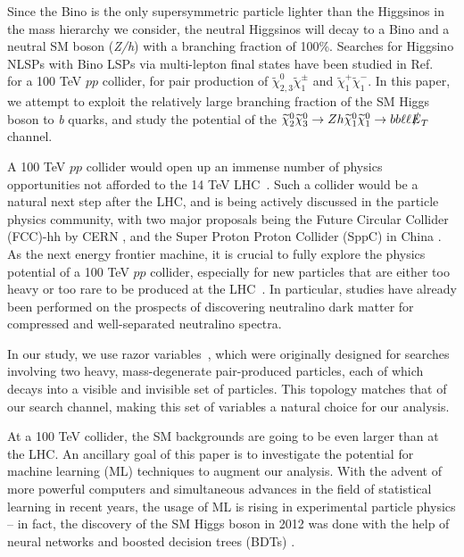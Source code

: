 \documentclass[a4paper,11pt]{article}
\newcommand{\N}{\widetilde{\chi}^0}
\newcommand{\C}{\widetilde{\chi}^\pm}
\newcommand{\met}{{\slashed{E}_T}}
\begin{document}
Since the Bino is the only supersymmetric particle lighter than the Higgsinos in
the mass hierarchy we consider, the neutral Higgsinos will decay to a Bino and a
neutral SM boson (\emph{Z/h}) with a branching fraction of 100\%.  Searches for
Higgsino NLSPs with Bino LSPs via  multi-lepton final states have been studied
in Ref.~\cite{Gori:2014oua} for a 100 TeV $pp$ collider, for pair production of
$\N_{2,3}\C_1$ and
$\widetilde\chi_{1}^+\widetilde\chi_1^-$. In this paper, we attempt to exploit
the relatively large branching fraction of the SM Higgs boson to \emph{b} quarks,
and study the potential of the $\N_2\N_3\rightarrow Zh
\N_1\N_1\rightarrow bb\ell\ell \met$ channel.

A 100 TeV $pp$ collider would open up an immense number of physics
opportunities not afforded to the 14 TeV LHC~\cite{Arkani-Hamed:2015vfh}.
Such a collider would be a natural next step after the LHC, and is being
actively discussed in the particle physics community, with two major proposals
being the Future Circular Collider (FCC)-hh by CERN \cite{FCC-hh}, and the
Super Proton Proton Collider (SppC)  in China \cite{CEPC}.  As the next energy
frontier machine, it is crucial to fully explore the physics
potential of a 100 TeV $pp$ collider, especially for new particles that are
either too heavy or too rare to be produced at the
LHC~\cite{Arkani-Hamed:2015vfh,Contino:2016spe,Golling:2016gvc,Mangano:2016jyj}.
In particular, studies have already been performed on the prospects of
discovering neutralino dark matter for compressed \cite{Low:2014cba,Cirelli:2014dsa,Mahbubani:2017gjh,Mahbubani:2018tin,Han:2018wus,Bramante:2014tba, Berlin:2015aba, 
Fukuda:2017jmk, Saito:2019rtg} and
well-separated \cite{Gori:2014oua,Acharya:2014pua,diCortona:2014yua} neutralino spectra.

In our study, we use razor variables~\cite{Rogan:2010kb}, which were originally designed
for searches involving two heavy, mass-degenerate pair-produced
particles, each of which decays into a visible and invisible set of
particles. This topology matches that of our search channel, making this
set of variables a natural choice for our analysis.  

At a 100 TeV collider, the  SM backgrounds are going to be even larger than
at the LHC.  An ancillary goal of this paper is to investigate the
potential for machine learning (ML) techniques to augment our analysis.
With the advent of more powerful computers and simultaneous advances in
the field of statistical learning in recent years, the usage of ML is
rising in experimental particle physics -- in fact, the discovery of the
SM Higgs boson in 2012 was done with the help of neural networks
\cite{Aad:2012tfa} and boosted decision trees (BDTs)
\cite{Chatrchyan:2012xdj}.
\end{document}
